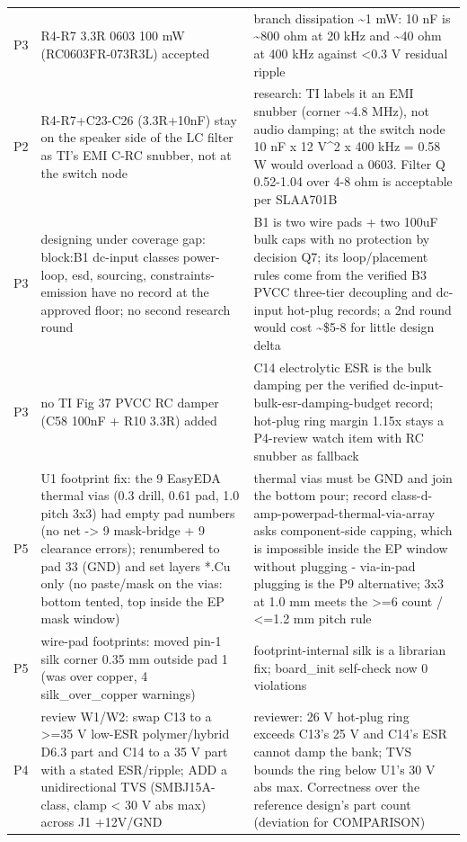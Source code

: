 \documentclass[11pt]{article}
\begin{document}
{\begin{longtable}{lp{5.2cm}p{7.2cm}}
P3 & R4-R7 3.3R 0603 100 mW (RC0603FR-073R3L) accepted & branch dissipation \textasciitilde{}1 mW: 10 nF is \textasciitilde{}800 ohm at 20 kHz and \textasciitilde{}40 ohm at 400 kHz against \textless{}0.3 V residual ripple \\
P2 & R4-R7+C23-C26 (3.3R+10nF) stay on the speaker side of the LC filter as TI's EMI C-RC snubber, not at the switch node & research: TI labels it an EMI snubber (corner \textasciitilde{}4.8 MHz), not audio damping; at the switch node 10 nF x 12 V\textasciicircum{}2 x 400 kHz = 0.58 W would overload a 0603. Filter Q 0.52-1.04 over 4-8 ohm is acceptable per SLAA701B \\
P3 & designing under coverage gap: block:B1 dc-input classes power-loop, esd, sourcing, constraints-emission have no record at the approved floor; no second research round & B1 is two wire pads + two 100uF bulk caps with no protection by decision Q7; its loop/placement rules come from the verified B3 PVCC three-tier decoupling and dc-input hot-plug records; a 2nd round would cost \textasciitilde{}\$5-8 for little design delta \\
P3 & no TI Fig 37 PVCC RC damper (C58 100nF + R10 3.3R) added & C14 electrolytic ESR is the bulk damping per the verified dc-input-bulk-esr-damping-budget record; hot-plug ring margin 1.15x stays a P4-review watch item with RC snubber as fallback \\
P5 & U1 footprint fix: the 9 EasyEDA thermal vias (0.3 drill, 0.61 pad, 1.0 pitch 3x3) had empty pad numbers (no net -\textgreater{} 9 mask-bridge + 9 clearance errors); renumbered to pad 33 (GND) and set layers {*}.Cu only (no paste/mask on the vias: bottom tented, top inside the EP mask window) & thermal vias must be GND and join the bottom pour; record class-d-amp-powerpad-thermal-via-array asks component-side capping, which is impossible inside the EP window without plugging - via-in-pad plugging is the P9 alternative; 3x3 at 1.0 mm meets the \textgreater{}=6 count / \textless{}=1.2 mm pitch rule \\
P5 & wire-pad footprints: moved pin-1 silk corner 0.35 mm outside pad 1 (was over copper, 4 silk\_over\_copper warnings) & footprint-internal silk is a librarian fix; board\_init self-check now 0 violations \\
P4 & review W1/W2: swap C13 to a \textgreater{}=35 V low-ESR polymer/hybrid D6.3 part and C14 to a 35 V part with a stated ESR/ripple; ADD a unidirectional TVS (SMBJ15A-class, clamp \textless{} 30 V abs max) across J1 +12V/GND & reviewer: 26 V hot-plug ring exceeds C13's 25 V and C14's ESR cannot damp the bank; TVS bounds the ring below U1's 30 V abs max. Correctness over the reference design's part count (deviation for COMPARISON) \\

\end{longtable}}
\end{document}
